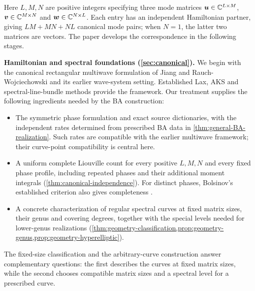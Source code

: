 Here $L,M,N$ are positive integers specifying three
mode matrices $\boldsymbol u\in\mathbb C^{L\times M}$,
$\boldsymbol v\in\mathbb C^{M\times N}$ and
$\boldsymbol w\in\mathbb C^{N\times L}$.
Each entry has an independent Hamiltonian partner, giving
$LM+MN+NL$ canonical mode pairs; when $N=1$, the latter two
matrices are vectors.
The paper develops the correspondence in the following stages.

\noindent\textbf{Hamiltonian and spectral foundations
(\cref{sec:canonical}).}
We begin with the canonical rectangular multiwave formulation of
Jiang and Rauch-Wojciechowski and its earlier wave-system setting.
Established Lax, AKS and spectral-line-bundle methods provide the
framework. Our treatment supplies the following ingredients needed
by the BA construction:
\begin{itemize}
\item The symmetric phase formulation and exact source dictionaries,
with the independent rates determined from prescribed BA data in
\cref{thm:general-BA-realization}.
Such rates are compatible with the earlier multiwave framework; their
curve-point compatibility is central here.
\item A uniform complete Liouville count for every positive $L,M,N$
and every fixed phase profile, including repeated phases and their
additional moment integrals
(\cref{thm:canonical-independence}). For distinct phases,
Bolsinov's established criterion also gives completeness
\cite{Bolsinov1992}.
\item A concrete characterization of regular spectral curves at fixed
matrix sizes, their genus and covering degrees, together with the
special levels needed for lower-genus realizations
(\cref{thm:geometry-classification,prop:geometry-genus,prop:geometry-hyperelliptic}).
\end{itemize}
The fixed-size classification and the arbitrary-curve construction
answer complementary questions: the first describes the curves at
fixed matrix sizes, while the second chooses compatible matrix sizes
and a spectral level for a prescribed curve.

